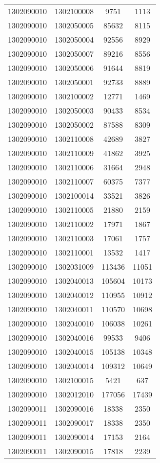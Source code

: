 \begin{longtable}{llcc}
1302090010 & 1302100008 & 9751 & 1113\\
1302090010 & 1302050005 & 85632 & 8115\\
1302090010 & 1302050004 & 92556 & 8929\\
1302090010 & 1302050007 & 89216 & 8556\\
1302090010 & 1302050006 & 91644 & 8819\\
1302090010 & 1302050001 & 92733 & 8889\\
1302090010 & 1302100002 & 12771 & 1469\\
1302090010 & 1302050003 & 90433 & 8534\\
1302090010 & 1302050002 & 87588 & 8309\\
1302090010 & 1302110008 & 42689 & 3827\\
1302090010 & 1302110009 & 41862 & 3925\\
1302090010 & 1302110006 & 31664 & 2948\\
1302090010 & 1302110007 & 60375 & 7377\\
1302090010 & 1302100014 & 33521 & 3826\\
1302090010 & 1302110005 & 21880 & 2159\\
1302090010 & 1302110002 & 17971 & 1867\\
1302090010 & 1302110003 & 17061 & 1757\\
1302090010 & 1302110001 & 13532 & 1417\\
1302090010 & 1302031009 & 113436 & 11051\\
1302090010 & 1302040013 & 105604 & 10173\\
1302090010 & 1302040012 & 110955 & 10912\\
1302090010 & 1302040011 & 110570 & 10698\\
1302090010 & 1302040010 & 106038 & 10261\\
1302090010 & 1302040016 & 99533 & 9406\\
1302090010 & 1302040015 & 105138 & 10348\\
1302090010 & 1302040014 & 109312 & 10649\\
1302090010 & 1302100015 & 5421 & 637\\
1302090010 & 1302012010 & 177056 & 17439\\
1302090011 & 1302090016 & 18338 & 2350\\
1302090011 & 1302090017 & 18338 & 2350\\
1302090011 & 1302090014 & 17153 & 2164\\
1302090011 & 1302090015 & 17818 & 2239\\

\end{longtable}
